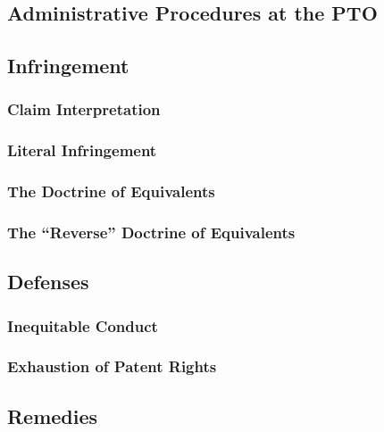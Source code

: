 

\subsection{Administrative Procedures at the PTO}


\subsection{Infringement}

\subsubsection{Claim Interpretation}


\subsubsection{Literal Infringement}


\subsubsection{The Doctrine of Equivalents}



\subsubsection{The ``Reverse'' Doctrine of Equivalents}


\subsection{Defenses}

\subsubsection{Inequitable Conduct}


\subsubsection{Exhaustion of Patent Rights}



\subsection{Remedies}


